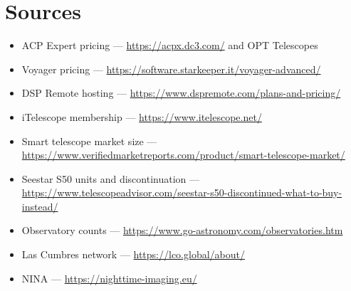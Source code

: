 \documentclass[11pt]{article}
\begin{document}
\section{Sources}

\begin{itemize}[leftmargin=1.4em,itemsep=1pt]
\small
  \item ACP Expert pricing --- \url{https://acpx.dc3.com/} and OPT Telescopes
  \item Voyager pricing --- \url{https://software.starkeeper.it/voyager-advanced/}
  \item DSP Remote hosting --- \url{https://www.dspremote.com/plans-and-pricing/}
  \item iTelescope membership --- \url{https://www.itelescope.net/}
  \item Smart telescope market size --- \url{https://www.verifiedmarketreports.com/product/smart-telescope-market/}
  \item Seestar S50 units and discontinuation --- \url{https://www.telescopeadvisor.com/seestar-s50-discontinued-what-to-buy-instead/}
  \item Observatory counts --- \url{https://www.go-astronomy.com/observatories.htm}
  \item Las Cumbres network --- \url{https://lco.global/about/}
  \item NINA --- \url{https://nighttime-imaging.eu/}
\end{itemize}
\end{document}
